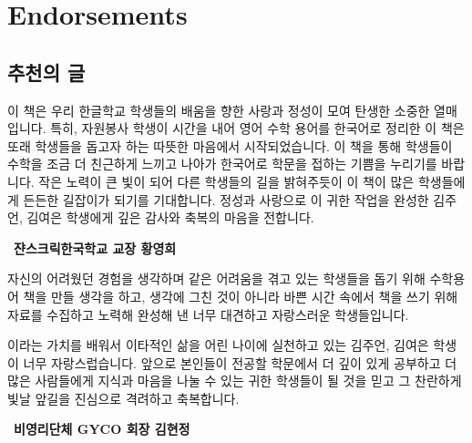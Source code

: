 \newpage
\section*{Endorsements}
\subsection*{추천의 글}
이 책은 우리 한글학교 학생들의 배움을 향한 사랑과 정성이 모여 탄생한 소중한 열매입니다. 
특히, 자원봉사 학생이 시간을 내어 영어 수학 용어를 한국어로 정리한 이 책은 또래 학생들을 
돕고자 하는 따뜻한 마음에서 시작되었습니다. 이 책을 통해 학생들이 수학을 조금 더 친근하게 
느끼고 나아가 한국어로 학문을 접하는 기쁨을 누리기를 바랍니다. 작은 노력이 큰 빛이 되어 
다른 학생들의 길을 밝혀주듯이 이 책이 많은 학생들에게 든든한 길잡이가 되기를 기대합니다. 
정성과 사랑으로 이 귀한 작업을 완성한 김주언, 김여은 학생에게 깊은 감사와 축복의 마음을 
전합니다.

\HF\ \textbf{쟌스크릭한국학교 교장 황영희}
\newline

자신의 어려웠던 경험을 생각하며 같은 어려움을 겪고 있는 학생들을 돕기 위해 수학용어 
책을 만들 생각을 하고, 생각에 그친 것이 아니라 바쁜 시간 속에서 책을 쓰기 위해 자료를 
수집하고 노력해 완성해 낸 너무 대견하고 자랑스러운 학생들입니다.

 이라는 가치를 배워서 이타적인 삶을 어린 나이에 실천하고 있는 김주언, 
김여은 학생이 너무 자랑스럽습니다. 앞으로 본인들이 전공할 학문에서 더 깊이 있게 공부하고 
더 많은 사람들에게 지식과 마음을 나눌 수 있는 귀한 학생들이 될 것을 믿고 그 찬란하게 
빛날 앞길을 진심으로 격려하고 축복합니다.

\HF\ \textbf{비영리단체 GYCO 회장 김현정}
\newline